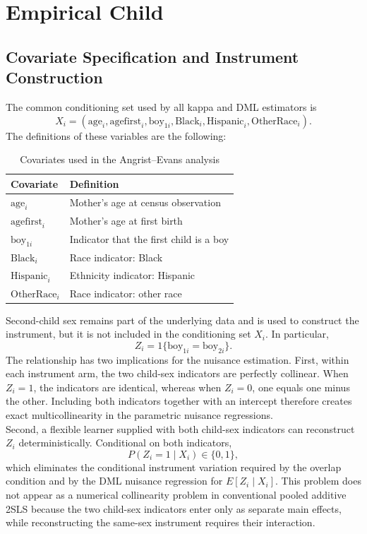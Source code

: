 \documentclass[12pt, a4paper, oneside]{article}
\theoremstyle{plain}
\theoremstyle{definition}
\begin{document}
\clearpage
\section{Empirical Child}
\subsection{Covariate Specification and Instrument Construction}
\label{app:child_covariate_design}

The common conditioning set used by all kappa and DML estimators is
\[
X_i=
\left(
\text{age}_i,
\text{agefirst}_i,
\text{boy}_{1i},
\text{Black}_i,
\text{Hispanic}_i,
\text{OtherRace}_i
\right).
\]
The definitions of these variables are the following:

\begin{table}[H]
\centering
\caption{Covariates used in the Angrist--Evans analysis}
\label{tab:ae_child_covariates}
\small
\begin{tabular}{ll}
\toprule
Covariate & Definition \\
\midrule
$\text{age}_i$        & Mother's age at census observation \\
$\text{agefirst}_i$   & Mother's age at first birth \\
$\text{boy}_{1i}$     & Indicator that the first child is a boy \\
$\text{Black}_i$      & Race indicator: Black \\
$\text{Hispanic}_i$   & Ethnicity indicator: Hispanic \\
$\text{OtherRace}_i$  & Race indicator: other race \\
\bottomrule
\end{tabular}
\end{table}

Second-child sex remains part of the underlying data and is used to construct
the instrument, but it is not included in the conditioning set \(X_i\). In
particular,
\[
Z_i
=
1\{\text{boy}_{1i}=\text{boy}_{2i}\}.
\]
The relationship has two implications for the nuisance estimation. First,
within each instrument arm, the two child-sex indicators are perfectly
collinear. When \(Z_i=1\), the indicators are identical, whereas when \(Z_i=0\),
one equals one minus the other. Including both indicators together with an
intercept therefore creates exact multicollinearity in the parametric
nuisance regressions.\\
Second, a flexible learner supplied with both child-sex indicators can
reconstruct \(Z_i\) deterministically. Conditional on both indicators,
\[
P(Z_i=1\mid X_i)\in\{0,1\},
\]
which eliminates the conditional instrument variation required by the overlap
condition and by the DML nuisance regression for \(E[Z_i\mid X_i]\). This
problem does not appear as a numerical collinearity problem in conventional
pooled additive 2SLS because the two child-sex indicators enter only as
separate main effects, while reconstructing the same-sex instrument requires
their interaction.
\end{document}
